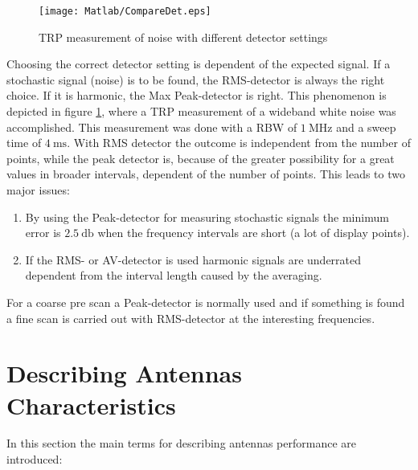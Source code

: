 \begin{figure}
\centering
\texttt{[image: Matlab/CompareDet.eps]}
\caption{TRP measurement of noise with different detector settings}
\label{fig:trpmeasnoise}
\end{figure}

Choosing the correct detector setting is dependent of the expected signal. If a stochastic signal (noise) is to be found, the \ac{RMS}-detector is always the right choice. If it is harmonic, the Max Peak-detector is right. This phenomenon is depicted in figure \ref{fig:trpmeasnoise}, where a \ac{TRP} measurement of a wideband white noise was accomplished. This measurement was done with a \ac{RBW} of $\SI{1}{\mega\hertz}$ and a sweep time of $\SI{4}{\milli\second}$. With \ac{RMS} detector the outcome is independent from the number of points, while the peak detector is, because of the greater possibility for a great values in broader intervals, dependent of the number of points. This leads to two major issues:

\begin{enumerate}
\item By using the Peak-detector for measuring stochastic signals the minimum error is $\SI{2.5}{\decibel}$ when the frequency intervals are short (a lot of display points).
\item If the \ac{RMS}- or AV-detector is used harmonic signals are underrated dependent from the interval length caused by the averaging.
\end{enumerate} 

For a coarse pre scan a Peak-detector is normally used and if something is found a fine scan is carried out with \ac{RMS}-detector at the interesting frequencies.

\section{Describing Antennas Characteristics}

In this section the main terms for describing antennas performance are introduced: \cite{balanis}

